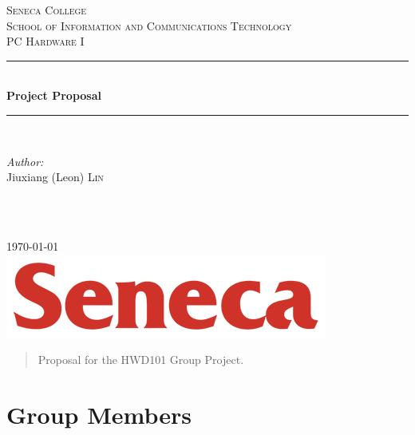 \documentclass[12pt]{article}
\begin{document}
\begin{titlepage}

\newcommand{\HRule}{\rule{\linewidth}{0.5mm}} %

\center %
 
\textsc{\LARGE Seneca College}\\[1.5cm]
\textsc{\Large School of Information and Communications Technology}\\[0.5cm]
\textsc{\large PC Hardware I}\\[0.5cm]

\HRule \\[0.4cm]
{ \huge \bfseries Project Proposal}\\[0.4cm] %
\HRule \\[1.5cm]
 
\begin{minipage}{0.4\textwidth}
\begin{flushleft} \large
\emph{Author:}\\
Jiuxiang (Leon) \textsc{Lin}
\end{flushleft}
\end{minipage}
~
\begin{minipage}{0.4\textwidth}
\begin{flushright} \large
\end{flushright}
\end{minipage}\\[2cm]

{\large \today}\\[2cm]

\includegraphics{logo.png}\\[1cm]

\vfill

\end{titlepage}


\begin{abstract}
Proposal for the HWD101 Group Project.	
\end{abstract}

\section{Group Members}
\end{document}
